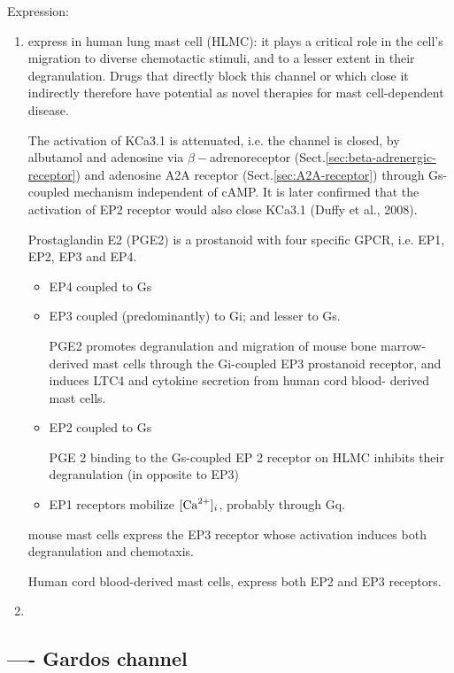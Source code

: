 Expression:
\begin{enumerate}
  \item express in human lung mast cell (HLMC):
it plays a critical role in the cell's migration to diverse chemotactic stimuli,
and to a lesser extent in their degranulation. Drugs that directly block this
channel or which close it indirectly therefore have potential as
novel therapies for mast cell-dependent disease.

The activation of KCa3.1 is attenuated, i.e. the channel is closed, by albutamol
and adenosine via $\beta-$adrenoreceptor
(Sect.\ref{sec:beta-adrenergic-receptor}) and adenosine A2A receptor
(Sect.\ref{sec:A2A-receptor}) through Gs-coupled mechanism independent of cAMP.
It is later confirmed that the activation of EP2 receptor would also close
KCa3.1 (Duffy et al., 2008).

\label{ref:GPE2}
Prostaglandin E2 (PGE2) is a prostanoid with four specific GPCR, i.e.
EP1, EP2, EP3 and EP4.
\begin{itemize}
  \item EP4 coupled to Gs
  \item EP3 coupled (predominantly) to Gi; and lesser to Gs.
  
PGE2 promotes degranulation and migration of mouse bone marrow-derived mast
cells through the Gi-coupled EP3 prostanoid receptor, and induces LTC4 and
cytokine secretion from human cord blood- derived mast cells.

  \item EP2 coupled to Gs

PGE 2 binding to the Gs-coupled EP 2 receptor on HLMC inhibits their
degranulation (in opposite to EP3)

  \item EP1 receptors mobilize $[{\text{Ca}^{2+}}]_i$, probably through Gq.
\end{itemize}
mouse mast cells express the EP3 receptor whose activation induces both
degranulation and chemotaxis.

Human cord blood-derived mast cells, express both EP2 and EP3 receptors.

  
  \item 
\end{enumerate}


\subsection{---- Gardos channel}
\label{sec:Gardos-channel}

